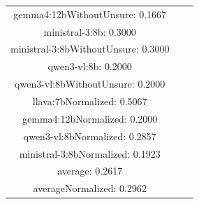 \documentclass[a4paper]{article}
\begin{document}
\begin{tabular}{ccc}
gemma4:12bWithoutUnsure: 0.1667 \\ ministral-3:8b: 0.3000 \\ ministral-3:8bWithoutUnsure: 0.3000 \\ qwen3-vl:8b: 0.2000 \\ qwen3-vl:8bWithoutUnsure: 0.2000 \\ llava:7bNormalized: 0.5067 \\ gemma4:12bNormalized: 0.2000 \\ qwen3-vl:8bNormalized: 0.2857 \\ ministral-3:8bNormalized: 0.1923 \\ average: 0.2617 \\ averageNormalized: 0.2962 \end{minipage}\\
\end{tabular}

\vspace{5mm}
\end{document}

